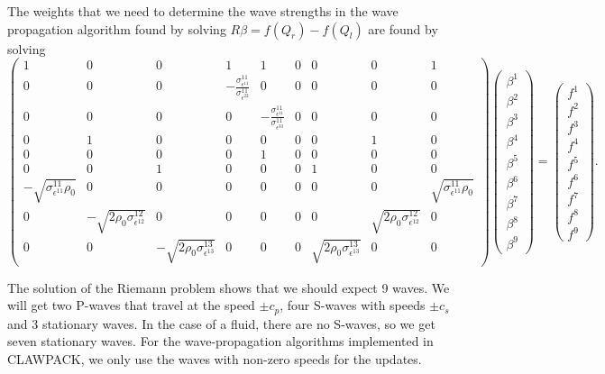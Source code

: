 \documentclass{article}
\begin{document}
The weights that we need to determine the wave strengths in the wave propagation algorithm found by 
solving $R \beta = f(Q_r) - f(Q_l)$ are found by solving
\begin{equation}
 \left ( \begin{array}{ccccccccc} 
 1& 0&0&1& 1&0&0&0& 1\\ 
 0&0 &0& -\frac{\sigma^{11}_{\epsilon^{11}}}{\sigma^{11}_{\epsilon^{22}}}& 0& 0&0&0&0 \\ 
 0&0 &0&0& -\frac{\sigma^{11}_{\epsilon^{11}}}{\sigma^{11}_{\epsilon^{33}}}&0&0&0&0 \\ 
0&1&0&0&0&0&0&1&0\\ 
 0&0&0&0&1 &0&0&0&0\\ 
 0&0&1&0&0&0&1&0&0\\
-\sqrt{\sigma^{11}_{\epsilon^{11}}\rho_0}& 0& 0& 0& 0& 0& 0&0&\sqrt{\sigma^{11}_{\epsilon^{11}}
\rho_0}\\ 
 0& -\sqrt{2\rho_0 \sigma^{12}_{\epsilon^{12}}} &0&0& 0& 0& 0 & \sqrt{2 \rho_0 
\sigma^{12}_{\epsilon^{12}}} &0 \\ 
 0& 0&-\sqrt{2\rho_0 \sigma^{13}_{\epsilon^{13}}} &0& 0& 0& \sqrt{2 \rho_0\sigma^{13}_{\epsilon^{13}}} 
&0 &0 \end{array}
\right )  \left ( \begin{array}{c} \beta^1\\ \beta^2 \\ \beta^3 \\ \beta^4\\ \beta^5\\ \beta^6 \\ \beta^7 \\ \beta^8 \\ 
\beta^9
\end{array}
\right ) = \left ( \begin{array}{c} f^1\\ f^2 \\ f^3 \\ f^4\\ f^5 \\f^6 \\f^7\\f^8\\f^9
\end{array}
\right ). 
\label{eqn:2dlgeulfwave}
\end{equation}

The solution of the Riemann problem shows that we should expect 9 waves.  We will get two P-waves 
that travel at the speed $\pm c_p$, four S-waves with speeds $\pm c_s$ and 3 stationary waves.  In the 
case of a fluid, there are no S-waves, so we get seven stationary waves.  For the wave-propagation 
algorithms implemented in CLAWPACK, we only use the waves with non-zero speeds for the updates.
\end{document}
